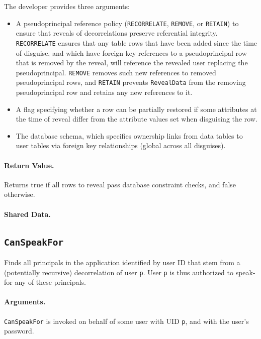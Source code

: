     The developer provides three arguments:
    \begin{itemize}[nosep]
    \item A pseudoprincipal reference policy (\texttt{RECORRELATE}, \texttt{REMOVE},
    or \texttt{RETAIN}) to ensure that reveals of decorrelations preserve
    referential integrity. \texttt{RECORRELATE} ensures that any table rows that
    have been added since the time of disguise, and which have foreign
    key references to a pseudoprincipal row that is removed by the reveal, will
    reference the revealed user replacing the pseudoprincipal.
    \texttt{REMOVE} removes such new references to removed pseudoprincipal rows,
    and \texttt{RETAIN} prevents \texttt{RevealData} from the removing
    pseudoprincipal row and retains any new references to it.
     
    \item A flag specifying whether a row can be partially restored if some
    attributes at the time of reveal differ from the attribute values set when
    disguising the row.

    \item The database schema, which specifies ownership links from data tables to user
    tables via foreign key relationships (global across all disguises).
    \end{itemize}

    \paragraph{Return Value.} 
    Returns true if all rows to reveal pass database constraint checks, and false otherwise.

    \paragraph{Shared Data.}

\subsection{\texttt{CanSpeakFor}}

    Finds all principals in the application identified by user ID that stem from
    a (potentially recursive) decorrelation of user \texttt{p}.
    User \texttt{p} is thus authorized to speak-for any of these principals.

    \paragraph{Arguments.} 
    \texttt{CanSpeakFor} is invoked on behalf of some user with UID \texttt{p},
    and with the user's password.

